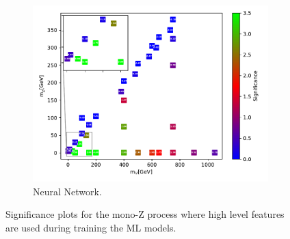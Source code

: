\begin{figure}[H]
    \begin{subfigure}[t!]{0.49\textwidth}
    \includegraphics[width = \textwidth]{Figures/Significances/significance_NN_monoZ_High_level.pdf}
    \caption{Neural Network.}
        \label{fig:signHighmonoZNN}
    \end{subfigure}
    \caption{Significance plots for the mono-Z process where high level features are used during training the ML models.}
    \label{fig:signHighmonoZ}
\end{figure}


